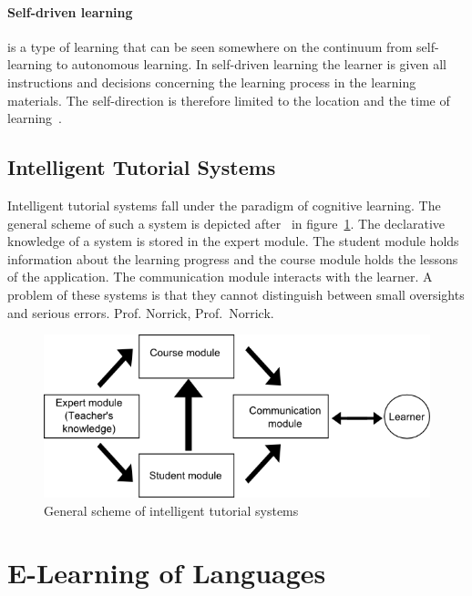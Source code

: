 \paragraph{Self-driven learning} is a type of learning that can be seen somewhere
on the continuum from self-learning to autonomous learning. In self-driven 
learning the learner is given all instructions and decisions concerning the
learning process in the learning materials. The self-direction is therefore 
limited to the location and the time of learning~.

\subsection{Intelligent Tutorial Systems}
\label{sec:elearn:intelligenttutorialsystems}

Intelligent tutorial systems fall under the paradigm of cognitive learning.
The general scheme of such a system is depicted after~ in 
figure~\ref{fig:tutorialsystems}. 
The declarative knowledge of a system is stored in the expert module. 
The student module holds information about the learning progress and the
course module holds the lessons of the application.
The communication module interacts with the learner.
A problem of these systems is that they cannot distinguish between
small oversights and serious errors. Prof. Norrick, Prof.\ Norrick.

\begin{figure}[htbp]
\begin{center}
\includegraphics[scale=0.5]{images/E-Learning/tutorialSystems.png}
\caption{General scheme of intelligent tutorial systems}
\label{fig:tutorialsystems}
\end{center}
\end{figure}

\section{E-Learning of Languages}
\label{sec:elearn:elearningoflanguages}

